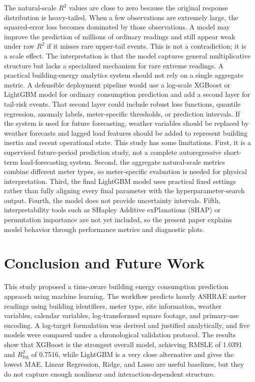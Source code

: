 \documentclass[conference]{IEEEtran}
\begin{document}
The natural-scale $R^2$ values are close to zero because the original response distribution is heavy-tailed. When a few observations are extremely large, the squared-error loss becomes dominated by those observations. A model may improve the prediction of millions of ordinary readings and still appear weak under raw $R^2$ if it misses rare upper-tail events. This is not a contradiction; it is a scale effect. The interpretation is that the model captures general multiplicative structure but lacks a specialized mechanism for rare extreme readings. A practical building-energy analytics system should not rely on a single aggregate metric. A defensible deployment pipeline would use a log-scale XGBoost or LightGBM model for ordinary consumption prediction and add a second layer for tail-risk events. That second layer could include robust loss functions, quantile regression, anomaly labels, meter-specific thresholds, or prediction intervals. If the system is used for future forecasting, weather variables should be replaced by weather forecasts and lagged load features should be added to represent building inertia and recent operational state. This study has some limitations. First, it is a supervised future-period prediction study, not a complete autoregressive short-term load-forecasting system. Second, the aggregate natural-scale metrics combine different meter types, so meter-specific evaluation is needed for physical interpretation. Third, the final LightGBM model uses practical fixed settings rather than fully aligning every final parameter with the hyperparameter-search output. Fourth, the model does not provide uncertainty intervals. Fifth, interpretability tools such as SHapley Additive exPlanations (SHAP) or permutation importance are not yet included, so the present paper explains model behavior through performance metrics and diagnostic plots.

\section{Conclusion and Future Work}
This study proposed a time-aware building energy consumption prediction appraoch using machine learning. The workflow predicts hourly ASHRAE meter readings using building identifiers, meter type, site information, weather variables, calendar variables, log-transformed square footage, and primary-use encoding. A log-target formulation was derived and justified analytically, and five models were compared under a chronological validation protocol. The results show that XGBoost is the strongest overall model, achieving RMSLE of 1.0391 and $R^2_{\log}$ of 0.7516, while LightGBM is a very close alternative and gives the lowest MAE. Linear Regression, Ridge, and Lasso are useful baselines, but they do not capture enough nonlinear and interaction-dependent structure.
\end{document}
